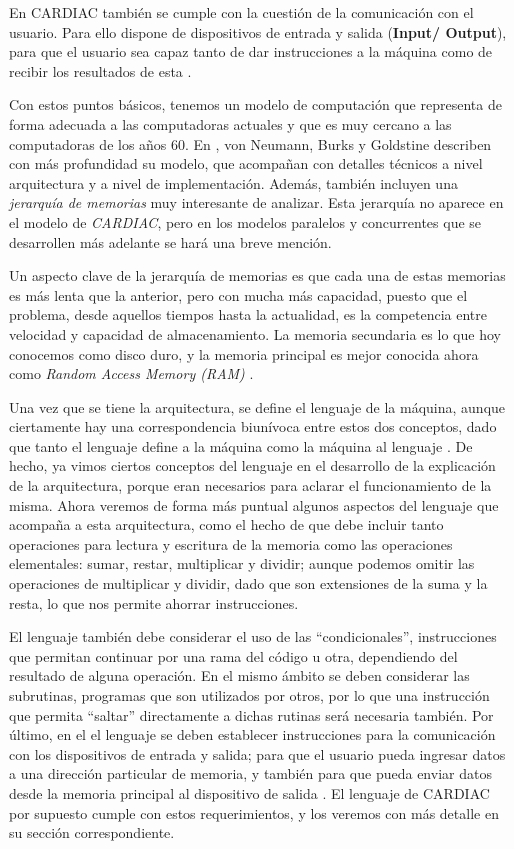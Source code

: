 \documentclass[letterpaper,12pt,oneside]{book}
\begin{document}
		
		En CARDIAC también se cumple con la cuestión de la comunicación con el usuario. Para ello dispone de dispositivos de entrada y salida (\textbf{Input/
		Output}), 
		para que
		el usuario sea capaz tanto de dar instrucciones a la máquina como de recibir los resultados de esta \cite{fingerman_instruction_1968}.
		
		Con estos puntos básicos, tenemos un modelo de computación que representa de forma adecuada a las computadoras actuales y que es muy cercano
		a las computadoras de los años 60. En  \cite{von_neumann_papers_1987},
		von Neumann, Burks y Goldstine describen con más profundidad su modelo, que acompañan con detalles técnicos
		a nivel arquitectura y a nivel de implementación. Además, también incluyen una 
		\textit{jerarquía de memorias} muy interesante de analizar. Esta jerarquía
		no aparece en el modelo de \textit{CARDIAC}, pero en los modelos paralelos y concurrentes que se desarrollen más adelante se hará
		una breve mención.

		Un aspecto clave de la jerarquía de memorias es que cada una de estas memorias es más lenta que la 
		anterior, pero con mucha más capacidad, puesto que el problema, desde aquellos tiempos hasta la actualidad,
		es la competencia entre velocidad y capacidad de almacenamiento. La memoria secundaria es lo que hoy conocemos como disco 
		duro, y la memoria principal es mejor conocida ahora como \textit{Random Access Memory (RAM)} \cite{von_neumann_papers_1987}.
		
		
		Una vez que se tiene la arquitectura, se define el lenguaje de la máquina, aunque ciertamente hay una correspondencia biunívoca entre estos
		dos conceptos, dado que tanto el lenguaje define a la máquina como la máquina al lenguaje \cite{tanenbaum_structured_2013}. 
		De hecho, ya vimos ciertos conceptos del lenguaje en el desarrollo de la explicación de la arquitectura, porque eran necesarios
		para aclarar el funcionamiento de la misma. Ahora veremos de forma más puntual algunos aspectos del lenguaje que acompaña a esta arquitectura,
		como el hecho de que 
		debe incluir tanto operaciones para lectura y escritura de la memoria como las operaciones elementales: sumar, restar, multiplicar y dividir; 
		aunque
		podemos omitir las operaciones de multiplicar y dividir, dado que son extensiones de la suma y la resta, lo que
		nos permite ahorrar instrucciones.

		El lenguaje también debe considerar el uso de las ``condicionales'', instrucciones que permitan continuar por una rama del código u otra,
		dependiendo del resultado de alguna operación. En el mismo ámbito se deben considerar las subrutinas, programas que son utilizados por otros,
	por lo
		que una instrucción que permita ``saltar'' directamente a dichas rutinas será necesaria también. Por último, 
		en el el lenguaje se deben establecer instrucciones para la comunicación con los dispositivos
		de entrada y salida; para que el usuario pueda ingresar datos a una dirección particular de memoria, y también para que
		pueda enviar datos desde la memoria principal al dispositivo de salida \cite{von_neumann_papers_1987}. El lenguaje de CARDIAC por supuesto
		cumple con estos requerimientos, y los veremos con más detalle en su sección correspondiente.
		
\end{document}
